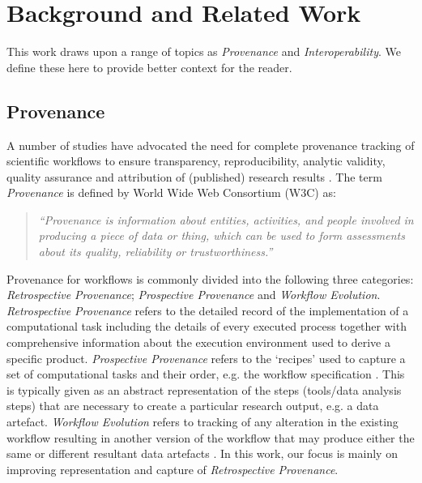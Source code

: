 \documentclass[a4paper,num-refs]{oup-contemporary}
\begin{document}
\section{Background and Related Work} \label{sec:background}
This work draws upon a range of topics as \textit{Provenance} and \textit{Interoperability}. We define these here to provide better context for the reader. 
\subsection{Provenance} \label{sec:provenance}
A number of studies have advocated the need for complete provenance tracking of scientific workflows to ensure transparency, reproducibility, analytic validity, quality assurance and attribution of (published) research results \citep{herschel_2017}. The term \textit{Provenance} is defined by World Wide Web Consortium (W3C) \citep{PROVDM} as: 
\begin{quote}
\centering
\textit{``Provenance is information about entities, activities, and people involved in producing a piece of data or thing, which can be used to form assessments about its quality, reliability or trustworthiness.''}
\end{quote}
 Provenance for workflows is commonly divided into the following three categories: \textit{Retrospective Provenance}; \textit{Prospective Provenance} and \textit{Workflow Evolution}. \textit{Retrospective Provenance} refers to the detailed record of the implementation of a computational task including the details of every executed process together with comprehensive information about the execution environment used to derive a specific product. \textit{Prospective Provenance} refers to the ‘recipes’ used to capture a set of computational tasks and their order, e.g. the workflow specification \citep{clifford_2008}. This is typically given as an abstract representation of the steps (tools/data analysis steps) that are necessary to create a particular research output, e.g. a data artefact. \textit{Workflow Evolution} refers to tracking of any alteration in the existing workflow resulting in another version of the workflow that may produce either the same or different resultant data artefacts \citep{Casati1998}. In this work, our focus is mainly on improving representation and capture of \textit{Retrospective Provenance}. 
 
\end{document}
